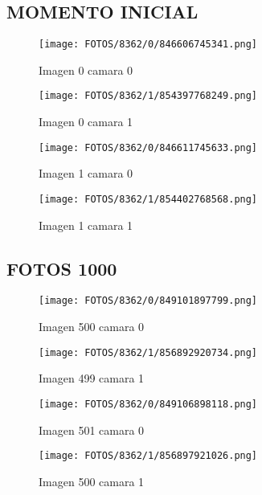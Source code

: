 \documentclass{article}
\begin{document}
\subsection{MOMENTO INICIAL}

\begin{figure}[H]
  \centering
  \begin{minipage}[b]{0.45\textwidth}
    \centering
    \texttt{[image: FOTOS/8362/0/846606745341.png]}
    \caption{Imagen 0 camara 0}
  \end{minipage}
  \begin{minipage}[b]{0.45\textwidth}
    \centering
    \texttt{[image: FOTOS/8362/1/854397768249.png]}
    \caption{Imagen 0 camara 1}
  \end{minipage}
  \begin{minipage}[b]{0.45\textwidth}
    \centering
    \texttt{[image: FOTOS/8362/0/846611745633.png]}
    \caption{Imagen 1 camara 0}
  \end{minipage}
  \begin{minipage}[b]{0.45\textwidth}
    \centering
    \texttt{[image: FOTOS/8362/1/854402768568.png]}
    \caption{Imagen 1 camara 1}
  \end{minipage}
\end{figure}

\subsection{FOTOS 1000}

\begin{figure}[H]
  \centering
  \begin{minipage}[b]{0.45\textwidth}
    \centering
    \texttt{[image: FOTOS/8362/0/849101897799.png]}
    \caption{Imagen 500 camara 0}
  \end{minipage}
  \begin{minipage}[b]{0.45\textwidth}
    \centering
    \texttt{[image: FOTOS/8362/1/856892920734.png]}
    \caption{Imagen 499 camara 1}
  \end{minipage}
  \begin{minipage}[b]{0.45\textwidth}
    \centering
    \texttt{[image: FOTOS/8362/0/849106898118.png]}
    \caption{Imagen 501 camara 0}
  \end{minipage}
  \begin{minipage}[b]{0.45\textwidth}
    \centering
    \texttt{[image: FOTOS/8362/1/856897921026.png]}
    \caption{Imagen 500 camara 1}
  \end{minipage}
\end{figure}
\end{document}
